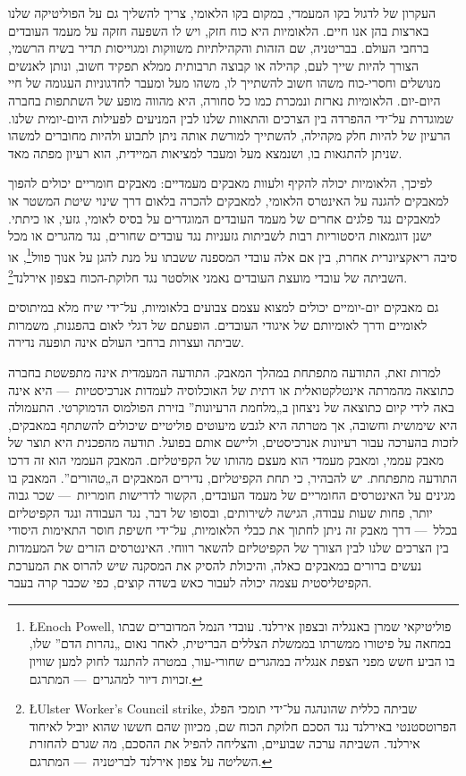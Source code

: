 העקרון של לדגול בקו המעמדי, במקום בקו הלאומי, צריך להשליך גם על הפוליטיקה שלנו בארצות בהן אנו חיים. הלאומיות היא כוח חזק, ויש לו השפעה חזקה על מעמד העובדים ברחבי העולם. בבריטניה, שם הזהות והקהילתיות משווקות ומגוייסות תדיר בשיח הרשמי, הצורך להיות שייך לעם, קהילה או קבוצה תרבותית ממלא תפקיד חשוב, ונותן לאנשים מנושלים וחסרי-כוח משהו חשוב להשתייך לו, משהו מעל ומעבר לחדגוניות העגומה של חיי היום-יום. הלאומיות נארזת ונמכרת כמו כל סחורה, היא מהווה מופע של השתתפות בחברה שמוגדרת על־ידי ההפרדה בין הצרכים והתאוות שלנו לבין המניעים לפעילות היום-יומית שלנו. הרעיון של להיות חלק מקהילה, להשתייך למורשת אותה ניתן לתבוע ולהיות מחוברים למשהו שניתן להתגאות בו, ושנמצא מעל ומעבר למציאות המיידית, הוא רעיון מפתה מאד.

לפיכך, הלאומיות יכולה להקיף ולעוות מאבקים מעמדיים: מאבקים חומריים יכולים להפוך למאבקים להגנה על האינטרס הלאומי, למאבקים להכרה בלאום דרך שינוי שיטת המשטר או למאבקים נגד פלגים אחרים של מעמד העובדים המוגדרים על בסיס לאומי, גזעי, או כיתתי. ישנן דוגמאות היסטוריות רבות לשביתות גזעניות נגד עובדים שחורים, נגד מהגרים או מכל סיבה ריאקציונרית אחרת, בין אם אלה עובדי המספנה ששבתו על מנת להגן על אנוך פוול\footnote{\L{Enoch Powell}, פוליטיקאי שמרן באנגליה ובצפון אירלנד. עובדי הנמל המדוברים שבתו במחאה על פיטורו ממשרתו בממשלת הצללים הבריטית, לאחר נאום „נהרות הדם” שלו, בו הביע חשש מפני הצפת אנגליה במהגרים שחורי-עור, במטרה להתנגד לחוק למען שוויון זכויות דיור למהגרים~— המתרגם.}, או השביתה של עובדי מועצת העובדים נאמני אולסטר נגד חלוקת-הכוח בצפון אירלנד\footnote{\L{Ulster Worker's Council strike}, שביתה כללית שהונהגה על־ידי תומכי הפלג הפרוטסטנטי באירלנד נגד הסכם חלוקת הכוח שם, מכיוון שהם חששו שהוא יוביל לאיחוד אירלנד. השביתה ערכה שבועיים, והצליחה להפיל את ההסכם, מה שגרם להחזרת השליטה על צפון אירלנד לבריטניה~— המתרגם.}.

גם מאבקים יום-יומיים יכולים למצוא עצמם צבועים בלאומיות, על־ידי שיח מלא במיתוסים לאומיים ודרך לאומיותם של איגודי העובדים. הופעתם של דגלי לאום בהפגנות, משמרות שביתה ועצרות ברחבי העולם אינה תופעה נדירה.

למרות זאת, התודעה מתפתחת במהלך המאבק. התודעה המעמדית אינה מתפשטת בחברה כתוצאה מהמרתה אינטלקטואלית או דתית של האוכלוסיה לעמדות אנרכיסטיות~— היא אינה באה לידי קיום כתוצאה של ניצחון ב„מלחמת הרעיונות” בזירת הפולמוס הדמוקרטי. התעמולה היא שימושית וחשובה, אך מטרתה היא לגבש מיעוטים פוליטיים שיכולים להשתתף במאבקים, לזכות בהערכה עבור רעיונות אנרכיסטים, וליישם אותם בפועל. תודעה מהפכנית היא תוצר של מאבק עממי, ומאבק מעמדי הוא מעצם מהותו של הקפיטליזם. המאבק העממי הוא זה דרכו התודעה מתפתחת. יש להבהיר, כי תחת הקפיטליזם, נדירים המאבקים ה„טהורים”. המאבק בו מגינים על האינטרסים החומריים של מעמד העובדים, הקשור לדרישות חומריות~— שכר גבוה יותר, פחות שעות עבודה, הגישה לשירותים, ובסופו של דבר, נגד העבודה ונגד הקפיטליזם בכלל~— דרך מאבק זה ניתן לחתוך את כבלי הלאומיות, על־ידי חשיפת חוסר התאימות היסודי בין הצרכים שלנו לבין הצורך של הקפיטליזם להשאר רווחי. האינטרסים הזרים של המעמדות נעשים ברורים במאבקים כאלה, והיכולת להסיק את המסקנה שיש להרוס את המערכת הקפיטליסטית עצמה יכולה לעבור כאש בשדה קוצים, כפי שכבר קרה בעבר.

